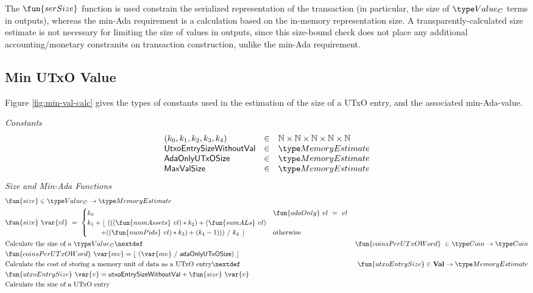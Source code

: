     The $\fun{serSize}$ function is used constrain
    the serialized representation of the transaction (in particular, the size
    of $\Value_C$ terms in outputs), whereas the min-Ada requirement is a calculation based on
    the in-memory representation size. A transparently-calculated size estimate
    is not necessary for limiting the size of values in outputs, since this size-bound
    check does not place any additional accounting/monetary constranits on transaction construction,
    unlike the min-Ada requirement.

\subsection{Min UTxO Value}
\label{sec:min-value}

Figure \ref{fig:min-val-calc} gives the types of constants used in the estimation
of the size of a UTxO entry, and the associated min-Ada-value.

\begin{figure*}[h]
  \emph{Constants}
  \begin{equation*}
    \begin{array}{lcl}
      (k_0, k_1, k_2, k_3, k_4) & \in & \N \times \N \times \N \times \N \times \N \\
      \mathsf{UtxoEntrySizeWithoutVal} & \in & \MemoryEstimate \\
      \mathsf{AdaOnlyUTxOSize} & \in & \MemoryEstimate \\
      \mathsf{MaxValSize} & \in & \MemoryEstimate \\
    \end{array}
  \end{equation*}
  \emph{Size and Min-Ada Functions}
  \begin{align*}
    & \fun{size} \in \Value_C \to \MemoryEstimate \\
    & \fun{size}~\var{vl} ~=~
    \begin{cases}
      k_0 & \fun{adaOnly}~vl~=~vl \\
      k_1 + \lfloor~ (((\fun{numAssets}~vl) * k_2) + (\fun{sumALs}~vl) & \\
      ~~~~~~ + ((\fun{numPids}~vl) * k_3) + (k_4 - 1)))~ /~ k_4~\rfloor & \text{otherwise} \\
    \end{cases} \\
    & \text{Calculate the size of a $\Value_C$}
    \nextdef
    & \fun{coinsPerUTxOWord}~\in \Coin \to \Coin \\
    & \fun{coinsPerUTxOWord}~\var{mv} = \lfloor~ (\var{mv}~/~ \mathsf{adaOnlyUTxOSize})~ \rfloor \\
    & \text{Calculate the cost of storing a memory unit of data as a UTxO entry}
    \nextdef
    & \fun{utxoEntrySize} \in \ValMonoid \to \MemoryEstimate \\
    & \fun{utxoEntrySize}~\var{v} = \mathsf{utxoEntrySizeWithoutVal} + \fun{size}~\var{v} \\
    & \text{Calculate the size of a UTxO entry}
\end{align*}
\caption{Value Size Calculation}
\label{fig:min-val-calc}
\end{figure*}

